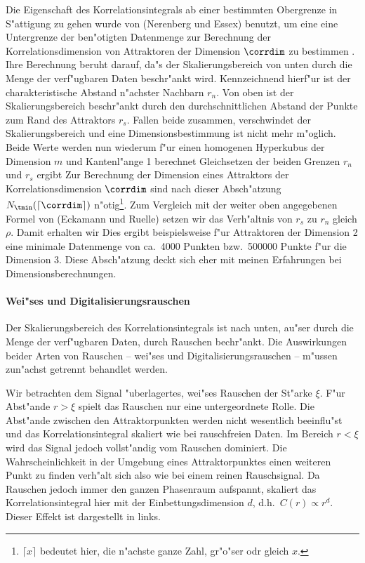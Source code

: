 Die Eigenschaft des Korrelationsintegrals ab einer bestimmten Obergrenze in S"attigung zu
gehen wurde von \autor(Nerenberg und Essex) benutzt, um eine eine Untergrenze der
ben"otigten Datenmenge zur Berechnung der Korrelationsdimension von Attraktoren der
Dimension $\corrdim$ zu bestimmen \cite{nerenberg-essex}. Ihre Berechnung beruht darauf, da"s der Skalierungsbereich
von unten durch die Menge der verf"ugbaren Daten beschr"ankt wird. Kennzeichnend hierf"ur
ist der charakteristische Abstand n"achster Nachbarn $r_n$. Von oben ist der Skalierungsbereich
beschr"ankt durch den durchschnittlichen Abstand der Punkte zum Rand des Attraktors
$r_s$. Fallen beide zusammen, verschwindet der Skalierungsbereich und eine
Dimensionsbestimmung ist nicht mehr m"oglich. Beide Werte werden nun wiederum f"ur einen
homogenen Hyperkubus der Dimension $m$ und Kantenl"ange 1 berechnet
Gleichsetzen der beiden Grenzen $r_n$ und $r_s$ ergibt
Zur Berechnung der Dimension eines Attraktors der Korrelationsdimension $\corrdim$ sind nach
dieser Absch"atzung $N_\tmin(\lceil \corrdim \rceil)$ n"otig\footnote{$\lceil x \rceil$
bedeutet hier, die n"achste ganze Zahl, gr"o"ser odr gleich $x$.}. Zum Vergleich mit der
weiter oben angegebenen Formel von \autor(Eckamann und Ruelle) setzen wir das Verh"altnis
von $r_s$ zu $r_n$ gleich $\rho$. Damit erhalten wir
Dies ergibt beispielsweise f"ur Attraktoren der Dimension 2 eine minimale Datenmenge von
ca.\  4000 Punkten bzw.\  500000 Punkte f"ur die Dimension 3. Diese Absch"atzung deckt
sich eher mit meinen Erfahrungen bei Dimensionsberechnungen. 





\paragraph{Wei"ses und Digitalisierungsrauschen}
Der Skalierungsbereich des Korrelationsintegrals ist nach unten, au"ser durch die Menge der 
verf"ugbaren Daten, durch Rauschen bechr"ankt. Die Auswirkungen beider Arten von
Rauschen -- wei"ses und Digitalisierungsrauschen -- m"ussen zun"achst getrennt behandlet
werden. 

Wir betrachten dem Signal "uberlagertes, wei"ses Rauschen der St"arke $\xi$. F"ur Abst"ande 
$r>\xi$ spielt das Rauschen nur eine untergeordnete Rolle. Die Abst"ande zwischen den
Attraktorpunkten werden nicht wesentlich beeinflu"st und das Korrelationsintegral skaliert 
wie bei rauschfreien Daten. 
Im Bereich $r<\xi$ wird das Signal jedoch vollst"andig vom Rauschen dominiert. Die
Wahrscheinlichkeit in der Umgebung eines Attraktorpunktes einen weiteren Punkt zu finden
verh"alt sich also wie bei einem reinen Rauschsignal. Da Rauschen jedoch immer den ganzen
Phasenraum aufspannt, skaliert das Korrelationsintegral hier mit der Einbettungsdimension
$d$, d.h.\  $C(r)\propto r^d$. Dieser Effekt ist dargestellt in  links.

